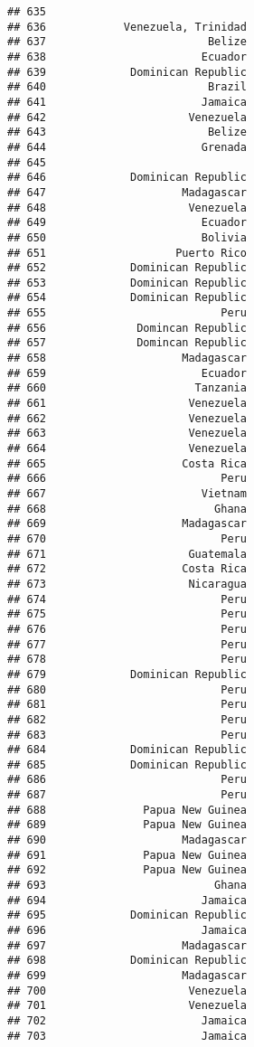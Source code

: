 \documentclass[
]{article}
\begin{document}
\begin{verbatim}
## 635                               
## 636            Venezuela, Trinidad
## 637                         Belize
## 638                        Ecuador
## 639             Dominican Republic
## 640                         Brazil
## 641                        Jamaica
## 642                      Venezuela
## 643                         Belize
## 644                        Grenada
## 645                               
## 646             Dominican Republic
## 647                     Madagascar
## 648                      Venezuela
## 649                        Ecuador
## 650                        Bolivia
## 651                    Puerto Rico
## 652             Dominican Republic
## 653             Dominican Republic
## 654             Dominican Republic
## 655                           Peru
## 656              Domincan Republic
## 657              Domincan Republic
## 658                     Madagascar
## 659                        Ecuador
## 660                       Tanzania
## 661                      Venezuela
## 662                      Venezuela
## 663                      Venezuela
## 664                      Venezuela
## 665                     Costa Rica
## 666                           Peru
## 667                        Vietnam
## 668                          Ghana
## 669                     Madagascar
## 670                           Peru
## 671                      Guatemala
## 672                     Costa Rica
## 673                      Nicaragua
## 674                           Peru
## 675                           Peru
## 676                           Peru
## 677                           Peru
## 678                           Peru
## 679             Dominican Republic
## 680                           Peru
## 681                           Peru
## 682                           Peru
## 683                           Peru
## 684             Dominican Republic
## 685             Dominican Republic
## 686                           Peru
## 687                           Peru
## 688               Papua New Guinea
## 689               Papua New Guinea
## 690                     Madagascar
## 691               Papua New Guinea
## 692               Papua New Guinea
## 693                          Ghana
## 694                        Jamaica
## 695             Dominican Republic
## 696                        Jamaica
## 697                     Madagascar
## 698             Dominican Republic
## 699                     Madagascar
## 700                      Venezuela
## 701                      Venezuela
## 702                        Jamaica
## 703                        Jamaica

\end{verbatim}
\end{document}
